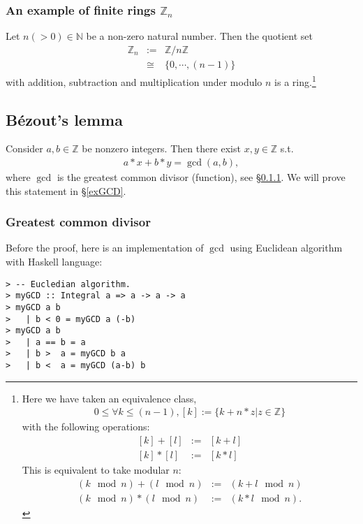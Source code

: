 \documentclass[11pt]{book}
\begin{document}
\subsubsection{An example of finite rings $\mathbb{Z}_n$}
Let $n (>0) \in \mathbb{N}$ be a non-zero natural number.
Then the quotient set
\begin{eqnarray}
\mathbb{Z}_n &:=& \mathbb{Z} / n\mathbb{Z} \\
&\cong& \{0, \cdots, (n-1)\}
\end{eqnarray}
with addition, subtraction and multiplication under modulo $n$ is a ring.\footnote{
Here we have taken an equivalence class, 
\begin{eqnarray}
0 \leq \forall k \leq (n-1), [k] := \{k + n*z | z \in \mathbb{Z} \}
\end{eqnarray}
with the following operations:
\begin{eqnarray}
\left[k \right] + \left[l \right] &:=& \left[k+l\right] \\
\left[k \right] * \left[l \right] &:=& \left[k * l\right]
\end{eqnarray}
This is equivalent to take modular $n$:
\begin{eqnarray}
(k \mod n) + (l \mod n) &:=& (k+l \mod n) \\
(k \mod n) * (l \mod n) &:=& (k*l \mod n).
\end{eqnarray}

}

\subsection{B\'ezout's lemma}
Consider $a,b \in \mathbb{Z}$ be nonzero integers.
Then there exist $x,y \in \mathbb{Z}$ s.t.
\begin{eqnarray}
a*x + b*y = \gcd(a,b),
\end{eqnarray}
where $\gcd$ is the greatest common divisor (function), see \S\ref{gcdDefinition}.
We will prove this statement in \S\ref{exGCD}.

\subsubsection{Greatest common divisor}
\label{gcdDefinition}
Before the proof, here is an implementation of $\gcd$ using Euclidean algorithm with Haskell language:

\begin{verbatim}
> -- Eucledian algorithm.
> myGCD :: Integral a => a -> a -> a
> myGCD a b
>   | b < 0 = myGCD a (-b)
> myGCD a b
>   | a == b = a
>   | b >  a = myGCD b a
>   | b <  a = myGCD (a-b) b
\end{verbatim}
\end{document}

